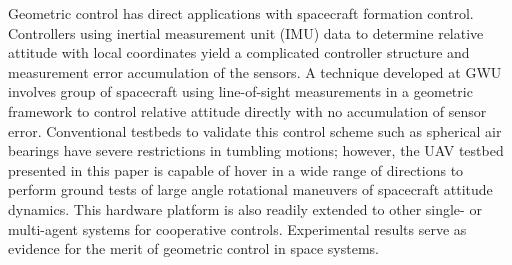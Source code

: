 \documentclass[10pt,a4paper]{article}
\theoremstyle{plain}\theorembodyfont{\normalfont}
\begin{document}
Geometric control has direct applications with spacecraft formation control. Controllers using inertial measurement unit (IMU) data to determine relative attitude with local coordinates yield a complicated controller structure and measurement error accumulation of the sensors. A technique developed at GWU involves group of spacecraft using line-of-sight measurements in a geometric framework to control relative attitude directly with no accumulation of sensor error. Conventional testbeds to validate this control scheme such as spherical air bearings have severe restrictions in tumbling motions; however, the UAV testbed presented in this paper is capable of hover in a wide range of directions to perform ground tests of large angle rotational maneuvers of spacecraft attitude dynamics. This hardware platform is also readily extended to other single- or multi-agent systems for cooperative controls. Experimental results serve as evidence for the merit of geometric control in space systems.
\end{document}

